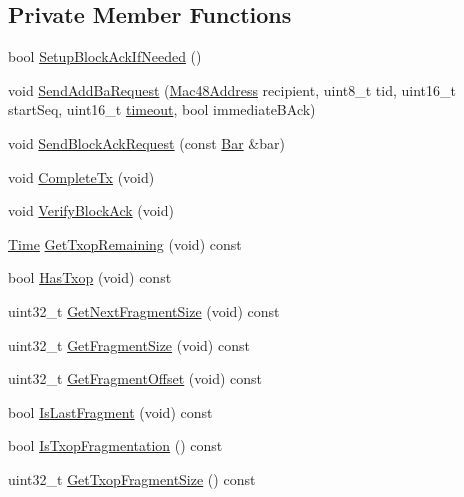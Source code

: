 \subsection*{Private Member Functions}
\begin{DoxyCompactItemize}
\item 
bool \hyperlink{classns3_1_1EdcaTxopN_ae5ab3e06174d86eabaaa6ccd64cde42d}{Setup\+Block\+Ack\+If\+Needed} ()
\item 
void \hyperlink{classns3_1_1EdcaTxopN_a5d000df80bfe3211aed2fee7c08b85d2}{Send\+Add\+Ba\+Request} (\hyperlink{classns3_1_1Mac48Address}{Mac48\+Address} recipient, uint8\+\_\+t tid, uint16\+\_\+t start\+Seq, uint16\+\_\+t \hyperlink{openflow-switch_8cc_a386d174ae121d1cfa279074b7e209714}{timeout}, bool immediate\+B\+Ack)
\item 
void \hyperlink{classns3_1_1EdcaTxopN_a620d3677a73927b708ba85d2f2a794e0}{Send\+Block\+Ack\+Request} (const \hyperlink{structns3_1_1Bar}{Bar} \&bar)
\item 
void \hyperlink{classns3_1_1EdcaTxopN_a39fb84b5e465de80209af523e9a500cf}{Complete\+Tx} (void)
\item 
void \hyperlink{classns3_1_1EdcaTxopN_a17b4025d63961a9f54cd9686d79a4709}{Verify\+Block\+Ack} (void)
\item 
\hyperlink{classns3_1_1Time}{Time} \hyperlink{classns3_1_1EdcaTxopN_a63c6254bc64d16c3e6ebe2b9320795a4}{Get\+Txop\+Remaining} (void) const 
\item 
bool \hyperlink{classns3_1_1EdcaTxopN_ad377cd7fb454ea77a7f7583393ff449a}{Has\+Txop} (void) const 
\item 
uint32\+\_\+t \hyperlink{classns3_1_1EdcaTxopN_a06163c06ebe2b11e164a171ff51f56a2}{Get\+Next\+Fragment\+Size} (void) const 
\item 
uint32\+\_\+t \hyperlink{classns3_1_1EdcaTxopN_afd4cef33e466d71740f40e94783cd0de}{Get\+Fragment\+Size} (void) const 
\item 
uint32\+\_\+t \hyperlink{classns3_1_1EdcaTxopN_afd235d222dc849f965706362ce15fcc3}{Get\+Fragment\+Offset} (void) const 
\item 
bool \hyperlink{classns3_1_1EdcaTxopN_aa4a1fb9ce28746fa0dc7d47dde40f2fa}{Is\+Last\+Fragment} (void) const 
\item 
bool \hyperlink{classns3_1_1EdcaTxopN_a8112c980e053b401d71b2031a17ec2b3}{Is\+Txop\+Fragmentation} () const 
\item 
uint32\+\_\+t \hyperlink{classns3_1_1EdcaTxopN_af20974348cb05b0e936b0f4204bca5c8}{Get\+Txop\+Fragment\+Size} () const 
\item 

\end{DoxyCompactItemize}

